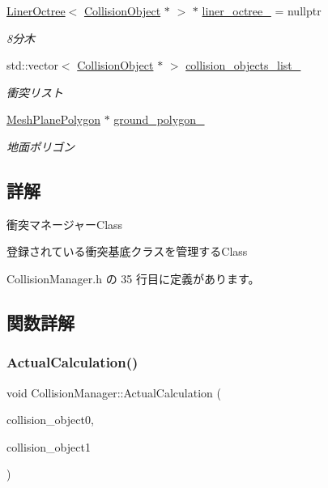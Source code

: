 \begin{DoxyCompactItemize}
\mbox{\hyperlink{class_liner_octree}{Liner\+Octree}}$<$ \mbox{\hyperlink{class_collision_object}{Collision\+Object}} $\ast$ $>$ $\ast$ \mbox{\hyperlink{class_collision_manager_aaaf833204e8ac7f3d649801abb95ecf5}{liner\+\_\+octree\+\_\+}} = nullptr
\begin{DoxyCompactList}\small\item\em 8分木 \end{DoxyCompactList}\item 
std\+::vector$<$ \mbox{\hyperlink{class_collision_object}{Collision\+Object}} $\ast$ $>$ \mbox{\hyperlink{class_collision_manager_a11b347344cfec378a0e752b4720e16b1}{collision\+\_\+objects\+\_\+list\+\_\+}}
\begin{DoxyCompactList}\small\item\em 衝突リスト \end{DoxyCompactList}\item 
\mbox{\hyperlink{class_mesh_plane_polygon}{Mesh\+Plane\+Polygon}} $\ast$ \mbox{\hyperlink{class_collision_manager_ab080264a45322bec38189279428d44cb}{ground\+\_\+polygon\+\_\+}}
\begin{DoxyCompactList}\small\item\em 地面ポリゴン \end{DoxyCompactList}\end{DoxyCompactItemize}


\subsection{詳解}
衝突マネージャー\+Class 

登録されている衝突基底クラスを管理する\+Class 

 Collision\+Manager.\+h の 35 行目に定義があります。



\subsection{関数詳解}
\mbox{\label{class_collision_manager_afe96885d766cf78376c5a8f929ab3c39}} 
\subsubsection{\texorpdfstring{Actual\+Calculation()}{ActualCalculation()}}
{\footnotesize\ttfamily void Collision\+Manager\+::\+Actual\+Calculation (\begin{DoxyParamCaption}\item[{\mbox{\hyperlink{class_collision_object}{Collision\+Object}} $\ast$}]{collision\+\_\+object0,  }\item[{\mbox{\hyperlink{class_collision_object}{Collision\+Object}} $\ast$}]{collision\+\_\+object1 }\end{DoxyParamCaption})\hspace{0.3cm}{\ttfamily [private]}}



